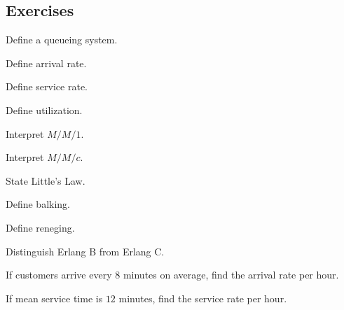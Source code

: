 \subsection{Exercises}
\label{subsec:queueing-exercises}

\begin{exercise}[1]
Define a queueing system.
\end{exercise}

\begin{exercise}[1]
Define arrival rate.
\end{exercise}

\begin{exercise}[1]
Define service rate.
\end{exercise}

\begin{exercise}[1]
Define utilization.
\end{exercise}

\begin{exercise}[1]
Interpret \(M/M/1\).
\end{exercise}

\begin{exercise}[1]
Interpret \(M/M/c\).
\end{exercise}

\begin{exercise}[1]
State Little's Law.
\end{exercise}

\begin{exercise}[1]
Define balking.
\end{exercise}

\begin{exercise}[1]
Define reneging.
\end{exercise}

\begin{exercise}[1]
Distinguish Erlang B from Erlang C.
\end{exercise}

\begin{exercise}[2]
If customers arrive every \(8\) minutes on average, find the arrival rate
per hour.
\end{exercise}

\begin{exercise}[2]
If mean service time is \(12\) minutes, find the service rate per hour.
\end{exercise}

